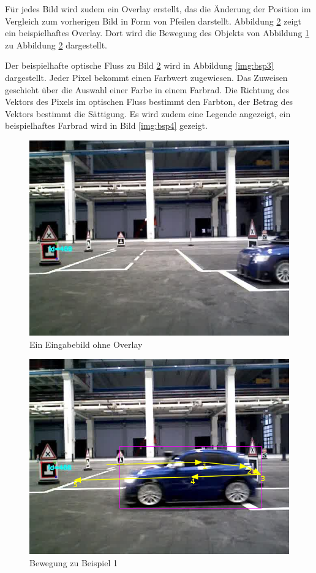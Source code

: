 Für jedes Bild wird zudem ein Overlay erstellt, das die Änderung der Position im Vergleich zum vorherigen Bild in Form von Pfeilen darstellt. Abbildung \ref{img:bsp2} zeigt ein beispielhaftes Overlay. Dort wird die Bewegung des Objekts von Abbildung \ref{img:bsp1} zu Abbildung \ref{img:bsp2} dargestellt.
 
Der beispielhafte optische Fluss zu Bild \ref{img:bsp2} wird in Abbildung \ref{img:bsp3} dargestellt. Jeder Pixel bekommt einen Farbwert zugewiesen. Das Zuweisen geschieht über die Auswahl einer Farbe in einem Farbrad. Die Richtung des Vektors des Pixels im optischen Fluss bestimmt den Farbton, der Betrag des Vektors bestimmt die Sättigung. Es wird zudem eine Legende angezeigt, ein beispielhaftes Farbrad wird in Bild \ref{img:bsp4} gezeigt.

\begin{figure}[p]
	\centering
	\includegraphics[scale=0.5]{./Abbildungen/bsp1.jpg}
	\caption{Ein Eingabebild ohne Overlay}
	\label{img:bsp1}
\end{figure}

\begin{figure}[p]
	\centering
	\includegraphics[scale=0.5]{./Abbildungen/4.png}
	\caption{Bewegung zu Beispiel 1}
	\label{img:bsp2}
\end{figure}

